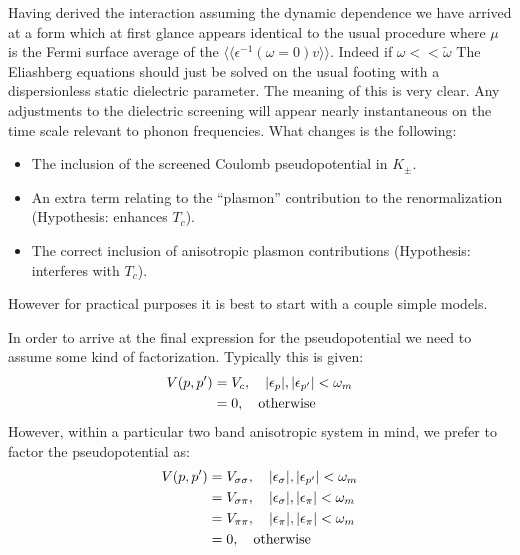 \documentclass{article}
\def\r{{\bf r}}
\def\q{{\bf q}}
\def\bra{\langle}
\def\ket{\rangle}
\begin{document}
Having derived the interaction assuming the dynamic dependence we have arrived at a form 
which at first glance appears identical to the usual procedure where $\mu$ is the Fermi
surface average of the $\bra \bra \epsilon^{-1}(\omega=0)v\ket \ket$. Indeed if $\omega << \tilde{\omega}$
The Eliashberg equations should just be solved on the usual footing with a dispersionless static dielectric
parameter. The meaning of this is very clear. Any adjustments to the dielectric 
screening will appear nearly instantaneous on the time scale relevant to phonon frequencies.
What changes is the following: 
%
\begin {itemize}
\item The inclusion of the screened Coulomb pseudopotential in $K_{\pm}$.
\item An extra term relating to the ``plasmon'' contribution to the renormalization (Hypothesis: enhances $T_{c}$).
\item The correct inclusion of anisotropic plasmon contributions (Hypothesis: interferes with $T_c$).
\end {itemize}
%
%
%

However for practical purposes it is best to start with a couple simple models.

In order to arrive at the final expression for the pseudopotential 
we need to assume some kind of factorization. Typically this is given:
%
\begin{align}
V(p,p') & =  V_{c}, \quad |\epsilon_{p}|, |\epsilon_{p'}| < \omega_{m} \nonumber \\
        & =  0, \quad {\rm otherwise}
\end{align}
%
However, within a particular two band anisotropic system in mind, we prefer to factor 
the pseudopotential as:
%
\begin{align}
V(p,p') & =  V_{\sigma \sigma}, \quad |\epsilon_{\sigma}|, |\epsilon_{p'}| < \omega_{m} \nonumber \\
        & =  V_{\sigma\pi}, \quad |\epsilon_{\sigma}|, |\epsilon_{\pi}| < \omega_{m} \nonumber \\
        & =  V_{\pi\pi}, \quad |\epsilon_{\pi}|, |\epsilon_{\pi}|  < \omega_{m} \nonumber \\
        & =  0, \quad {\rm otherwise}
\end{align}
%
\end{document}
